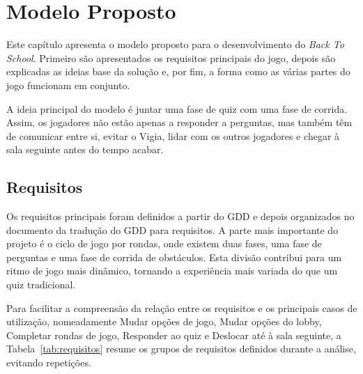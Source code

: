 \chapter{Modelo Proposto}
\label{ch:modeloProposto}

Este capítulo apresenta o modelo proposto para o desenvolvimento do \textit{Back To School}. Primeiro são apresentados os requisitos principais do jogo, depois são explicadas as ideias base da solução e, por fim, a forma como as várias partes do jogo funcionam em conjunto.

A ideia principal do modelo é juntar uma fase de quiz com uma fase de corrida. Assim, os jogadores não estão apenas a responder a perguntas, mas também têm de comunicar entre si, evitar o Vigia, lidar com os outros jogadores e chegar à sala seguinte antes do tempo acabar.


\section{Requisitos}
\label{sec:requisitos}

Os requisitos principais foram definidos a partir do GDD e depois organizados no documento da tradução do GDD para requisitos. A parte mais importante do projeto é o ciclo de jogo por rondas, onde existem duas fases, uma fase de perguntas e uma fase de corrida de obstáculos. Esta divisão contribui para um ritmo de jogo mais dinâmico, tornando a experiência mais variada do que um quiz tradicional.

Para facilitar a compreensão da relação entre os requisitos e os principais casos de utilização, nomeadamente Mudar opções de jogo, Mudar opções do lobby, Completar rondas de jogo, Responder ao quiz e Deslocar até à sala seguinte, a Tabela~\ref{tab:requisitos} resume os grupos de requisitos definidos durante a análise, evitando repetições.

